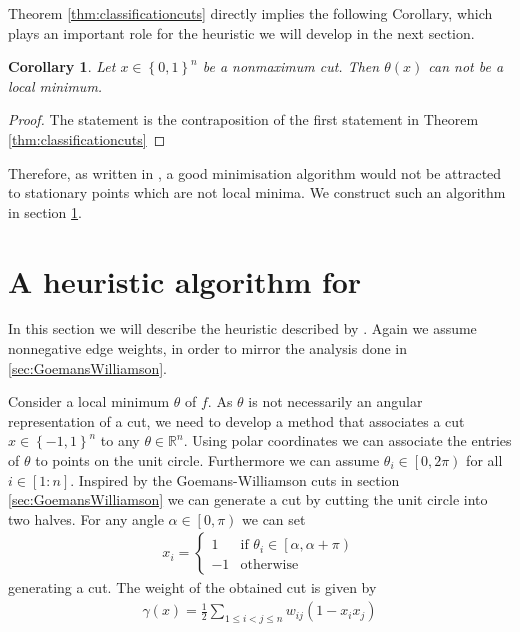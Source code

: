 \documentclass[12pt,a4paper]{article}
\theoremstyle{mythm}
\newtheorem{cor}[thm]{Corollary}
\begin{document}
Theorem \ref{thm:classificationcuts} directly implies the following Corollary, which plays an important role for the heuristic we will develop in the next section.
\begin{cor}
Let $ x \in \left\{ 0,1 \right\} ^{ n } $ be a nonmaximum cut. Then $ \theta ( x )  $ can not be a local minimum.
\end{cor} 
\begin{proof}
The statement is the contraposition of the first statement in Theorem \ref{thm:classificationcuts} 
\end{proof}
Therefore, as written in \cite[p.509]{Burer2002}, a good minimisation algorithm would not be attracted to stationary points which are not local minima. 
We construct such an algorithm in section \ref{sec:BurerHeuristic}.
\newpage
\section{A heuristic algorithm for \MCP} 
\label{sec:BurerHeuristic} 
In this section we will describe the heuristic described by \cite{Burer2002}.
Again we assume nonnegative edge weights, in order to mirror the analysis done in \ref{sec:GoemansWilliamson}.

Consider a local minimum $ \theta $ of $ f $.
As $ \theta $ is not necessarily an angular representation of a cut, we need to develop a method that associates a cut $ x \in \left\{ -1,1 \right\} ^{ n }  $ to any $ \theta \in
\mathbb{R} ^{ n }  $.
Using polar coordinates we can associate the entries of $ \theta $ to points on the unit circle.
Furthermore we can assume $ \theta_i \in \left[ 0, 2\pi \right)  $ for all $ i \in \left[ 1:n \right]  $.
Inspired by the Goemans-Williamson cuts in section \ref{sec:GoemansWilliamson} we can generate a cut by cutting the unit circle into two halves. 
For any angle $ \alpha \in \left[ 0, \pi \right)  $ we can set
\begin{align}
\label{eq:assigncut} 
x_i = \begin{cases}
1 & \text{if } \theta_i \in \left[ \alpha , \alpha + \pi \right) \\
-1 & \text{otherwise}
\end{cases}
\end{align} 
generating a cut.
The weight of the obtained cut is given by
\begin{align*}
\gamma (x) = \frac{ 1 }{ 2 } \sum_{ 1 \leq i < j \leq n }^{  } w _{ ij } \left( 1 - x_i x_j \right) 
\end{align*} 
\end{document}
